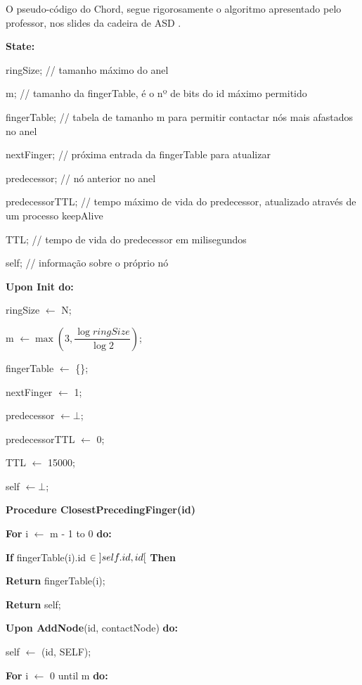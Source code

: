 \documentclass[12pt]{article}
\begin{document}
O pseudo-código do Chord, segue rigorosamente o algoritmo apresentado pelo professor, nos slides da cadeira de ASD \cite{b1}.

\bigbreak
\textbf{State:}

\qquad ringSize; // tamanho máximo do anel

\qquad m; // tamanho da fingerTable, é o nº de bits do id máximo permitido

\qquad fingerTable; // tabela de tamanho m para permitir contactar nós mais afastados no anel

\qquad nextFinger; // próxima entrada da fingerTable para atualizar

\qquad predecessor; // nó anterior no anel

\qquad predecessorTTL; // tempo máximo de vida do predecessor, atualizado através de um processo keepAlive

\qquad TTL; // tempo de vida do predecessor em milisegundos

\qquad self; // informação sobre o próprio nó

\bigbreak
\textbf{Upon Init do:}

\qquad ringSize $\leftarrow$ N;

\qquad m $\leftarrow \max(3, \dfrac{\log ringSize}{\log 2})$;

\qquad fingerTable $\leftarrow$ \{\};

\qquad nextFinger $\leftarrow$ 1;

\qquad predecessor $\leftarrow \bot$;

\qquad predecessorTTL $\leftarrow$ 0;

\qquad TTL $\leftarrow$ 15000;

\qquad self $\leftarrow \bot$;

\bigbreak

\textbf{Procedure ClosestPrecedingFinger(id)}

\qquad \textbf{For} i $\leftarrow$ m - 1 to 0 \textbf{do:}

\qquad \qquad \textbf{If} fingerTable(i).id $\in \interval[open]{self.id}{id}$ \textbf{Then}

\qquad \qquad \qquad \textbf{Return} fingerTable(i);

\qquad \textbf{Return} self;

\bigbreak
\textbf{Upon AddNode}(id, contactNode) \textbf{do:}

\qquad self $\leftarrow$ (id, SELF);

\qquad \textbf{For} i $\leftarrow$ 0 until m \textbf{do:}
\end{document}
